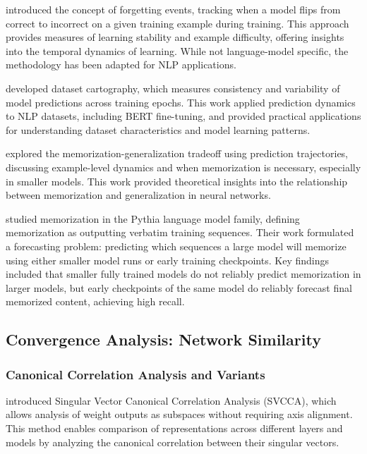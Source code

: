 \citet{toneva2019empirical} introduced the concept of forgetting events, tracking when a model flips from correct to incorrect on a given training example during training. This approach provides measures of learning stability and example difficulty, offering insights into the temporal dynamics of learning. While not language-model specific, the methodology has been adapted for NLP applications.

\citet{swayamdipta2020dataset} developed dataset cartography, which measures consistency and variability of model predictions across training epochs. This work applied prediction dynamics to NLP datasets, including BERT fine-tuning, and provided practical applications for understanding dataset characteristics and model learning patterns.

\citet{feldman2020does} explored the memorization-generalization tradeoff using prediction trajectories, discussing example-level dynamics and when memorization is necessary, especially in smaller models. This work provided theoretical insights into the relationship between memorization and generalization in neural networks.

\citet{biderman2023emergent} studied memorization in the Pythia language model family, defining memorization as outputting verbatim training sequences. Their work formulated a forecasting problem: predicting which sequences a large model will memorize using either smaller model runs or early training checkpoints. Key findings included that smaller fully trained models do not reliably predict memorization in larger models, but early checkpoints of the same model do reliably forecast final memorized content, achieving high recall.

\subsection{Convergence Analysis: Network Similarity}

\subsubsection{Canonical Correlation Analysis and Variants}

\citet{raghu2017svcca} introduced Singular Vector Canonical Correlation Analysis (SVCCA), which allows analysis of weight outputs as subspaces without requiring axis alignment. This method enables comparison of representations across different layers and models by analyzing the canonical correlation between their singular vectors.

